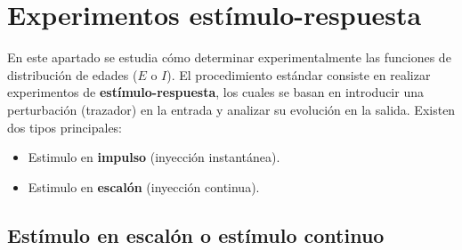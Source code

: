 
\vspace{0.3cm}

\section{Experimentos estímulo-respuesta}

\noindent En este apartado se estudia cómo determinar experimentalmente las funciones de distribución de edades ($E$ o $I$). El procedimiento estándar consiste en realizar experimentos de \textbf{estímulo-respuesta}, los cuales se basan en introducir una perturbación (trazador) en la entrada y analizar su evolución en la salida. Existen dos tipos principales:
\begin{itemize}
    \item Estimulo en \textbf{impulso} (inyección instantánea).
    \item Estimulo en \textbf{escalón} (inyección continua).
\end{itemize}

\subsection{Estímulo en escalón o estímulo continuo}

